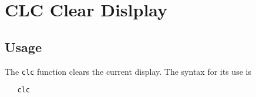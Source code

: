 \section{CLC Clear Dislplay}

\subsection{Usage}

The \verb|clc| function clears the current display.  The syntax for
its use is
\begin{verbatim}
   clc
\end{verbatim}
